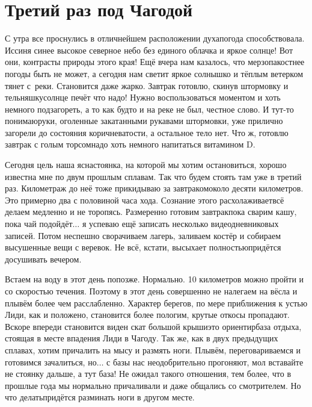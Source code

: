 \chapter{Третий раз под Чагодой} 

С утра все проснулись в отличнейшем расположении духа\mdash погода способствовала. Иссиня синее высокое северное небо без единого облачка и яркое солнце! Вот они, контрасты природы этого края! Ещё вчера нам казалось, что мерзопакостнее погоды быть не может, а сегодня нам светит яркое солнышко и тёплым ветерком тянет с~реки. Становится даже жарко. Завтрак готовлю, скинув штормовку и тельняшку\mdash солнце печёт что надо! Нужно воспользоваться моментом и хоть немного подзагореть, а то как будто и на реке не был, честное слово. И тут-то понимаю\mdash руки, оголенные закатанными рукавами штормовки, уже прилично загорели до состояния коричневатости, а остальное тело нет. Что ж, готовлю завтрак с голым торсом\mdash надо хоть немного напитаться витамином D.

Сегодня цель наша ясна\mdash стоянка, на которой мы хотим остановиться, хорошо известна мне по двум прошлым сплавам. Так что будем стоять там уже в третий раз. Километраж до неё тоже прикидываю за завтраком\mdash около десяти километров. Это примерно два с половиной часа хода. Сознание этого расхолаживает\mdash всё делаем медленно и не торопясь. Размеренно готовим завтрак\mdash пока сварим кашу, пока чай подойдёт$\ldots$ я успеваю ещё записать несколько видеодневниковых записей. Потом неспешно сворачиваем лагерь, заливаем костёр и собираем высушенные вещи с веревок. Не всё, кстати, высыхает полностью\mdash придётся досушивать вечером.

Встаем на воду в этот день попозже. Нормально. 10 километров можно пройти и со скоростью течения. Поэтому в этот день совершенно не налегаем на вёсла и плывём более чем расслабленно.  Характер берегов, по мере приближения к устью Лиди, как и положено, становится более пологим, крутые откосы пропадают. Вскоре впереди становится виден скат большой крыши\mdash это ориентир\mdash база отдыха, стоящая в месте впадения Лиди в Чагоду. Так же, как в двух предыдущих сплавах, хотим причалить на мысу и размять ноги. Плывём, переговариваемся и готовимся зачалиться, но$\ldots$ с базы нас неодобрительно прогоняют, мол вставайте не стоянку дальше, а тут база! Не ожидал такого отношения, тем более, что в прошлые года мы нормально причаливали и даже общались со смотрителем. Но что делать\mdash придётся разминать ноги в другом месте. 

